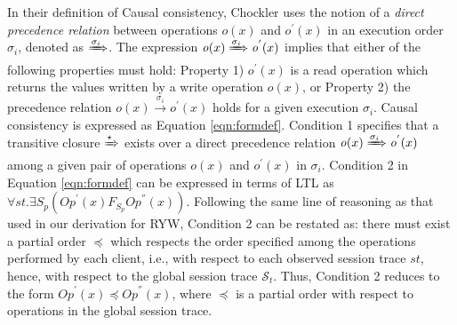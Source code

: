 \documentclass[journal,compsoc]{IEEEtran}
\begin{document}
\par In their definition of Causal consistency, Chockler uses the notion of a 
\emph{direct precedence relation} between operations $\mathit{o}(x)$
 and $\mathit{o}^{'}(x) $ in an execution order $\sigma_i$, denoted as $\xRightarrow{\sigma_i}$. The expression $\mathit{o}(x) \xRightarrow{\sigma_i} \mathit{o}^{'}(x) $
  implies that either of the following properties must hold: Property 1) $\mathit{o}^{'}(x) $ is a read operation which returns the values written by a write operation $\mathit{o}(x)$, or Property 2)  %
 the precedence relation 
$\mathit{o}(x) \xrightarrow{\sigma_i} \mathit{o}^{'}(x) $  holds for a given execution $\sigma_i$. Causal consistency is expressed as Equation \ref{eqn:formdef}. Condition 1 specifies that a transitive closure  $\xRightarrow{\star}$ exists  
  over a direct precedence relation $\mathit{o}(x) \xRightarrow{\sigma_i} \mathit{o}^{'}(x)$ among a given pair of operations $\mathit{o}(x)$  and $\mathit{o}^{'}(x) $ in $\sigma_i$. %
 Condition 2 in Equation \ref{eqn:formdef} can be expressed in terms of LTL as  $\forall \mathit{st}. \exists S_p \left( \mathit{Op}^{'}(x) F_{S_p} \mathit{Op}^{''}(x) \right)$.  %
  Following the same line of reasoning as that  used in our derivation for RYW, Condition 2 can be restated as: there must exist a partial order $\preccurlyeq$ which respects the order specified among the operations performed by each client, i.e., with respect to each observed session trace $\mathit{st}$, hence, with respect to the global session trace $\mathcal{S}_t$. Thus, Condition 2 reduces to the form ${\mathit{Op}}^{'}(x)  \preccurlyeq {\mathit{Op}}^{''}(x)  $, where $\preccurlyeq$ is a partial order with respect to operations in the global session trace.  
\end{document}
